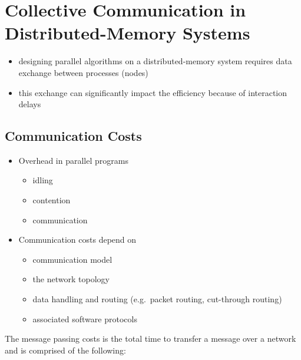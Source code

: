 \hypertarget{collective-communication-in-distributed-memory-systems}{%
\section{Collective Communication in Distributed-Memory
Systems}\label{collective-communication-in-distributed-memory-systems}}

\begin{itemize}
\tightlist
\item
  designing parallel algorithms on a distributed-memory system requires
  data exchange between processes (nodes)
\item
  this exchange can significantly impact the efficiency because of
  interaction delays
\end{itemize}

\hypertarget{communication-costs}{%
\subsection{Communication Costs}\label{communication-costs}}

\begin{itemize}
\tightlist
\item
  Overhead in parallel programs

  \begin{itemize}
  \tightlist
  \item
    idling
  \item
    contention
  \item
    communication
  \end{itemize}
\item
  Communication costs depend on

  \begin{itemize}
  \tightlist
  \item
    communication model
  \item
    the network topology
  \item
    data handling and routing (e.g.~packet routing, cut-through routing)
  \item
    associated software protocols
  \end{itemize}
\end{itemize}

The message passing costs is the total time to transfer a message over a
network and is comprised of the following:

